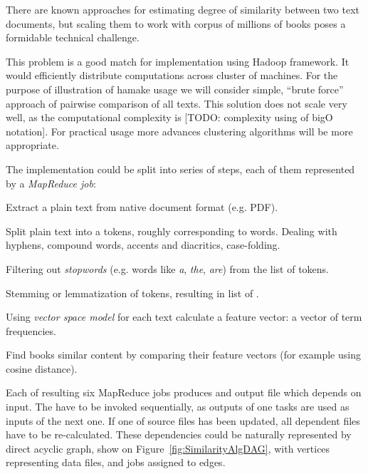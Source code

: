 \documentclass[10pt,conference,letterpaper]{IEEEtran}
\begin{document}
There are known approaches for estimating degree of similarity between
two text documents, but scaling them to work with corpus of millions
of books poses a formidable technical challenge.

This problem is a good match for implementation using Hadoop
framework. It would efficiently distribute computations across cluster
of machines. For the purpose of illustration of hamake usage we will
consider simple, ``brute force'' approach of pairwise comparison of
all texts. This solution does not scale very well, as the
computational complexity is [TODO: complexity using of bigO
notation]. For practical usage more advances clustering algorithms
will be more appropriate.

The implementation could be split into series of steps, each of them
represented by a \textit{MapReduce job}:

\begin{description}
\item[\emph{ExtractText}] Extract a plain text from native document format
  (e.g. PDF).
\item[\emph{Tokenize}] Split plain text into a tokens, roughly
  corresponding to words. Dealing with hyphens, compound words,
  accents and diacritics, case-folding.
\item[\emph{FilterStopwords}] Filtering out \textit{stopwords} (e.g. words
  like \textit{a}, \textit{the}, \textit{are}) from the list of
  tokens.
\item[\emph{Normalize}] Stemming or lemmatization of tokens,
  resulting in list of .
\item[\emph{CalculateTF}] Using \textit{vector space
    model}\cite{manning2008introduction} for each text calculate a
  feature vector: a vector of term frequencies.
\item[\emph{FindSimilar}] Find books similar content by comparing
  their feature vectors (for example using cosine
  distance\cite{wiki:cosinesimilarity}).
\end{description}

Each of resulting six MapReduce jobs produces and output file which
depends on input. The have to be invoked sequentially, as outputs of
one tasks are used as inputs of the next one. If one of source files
has been updated, all dependent files have to be re-calculated. These
dependencies could be naturally represented by direct acyclic graph,
show on Figure~\ref{fig:SimilarityAlgDAG}, with vertices representing
data files, and jobs assigned to edges.
\end{document}
